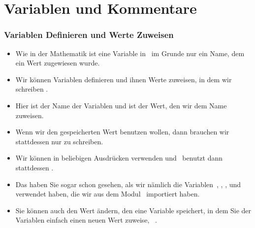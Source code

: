 \documentclass[aspectratio=169,mathserif,notheorems]{beamer}%
\begin{document}
\section{Variablen und Kommentare}%
%
\begin{frame}%
\frametitle{Variablen Definieren und Werte Zuweisen}%
\begin{itemize}%
\item Wie in der Mathematik ist eine Variable in \python\ im Grunde nur ein Name, dem ein Wert zugewiesen wurde.%
\item<2-> Wir können Variablen definieren und ihnen Werte zuweisen, in dem wir schreiben .%
\item<3-> Hier ist  der Name der Variablen und  ist der Wert, den wir dem Name zuweisen.%
\item<4-> Wenn wir den gespeicherten Wert benutzen wollen, dann brauchen wir stattdessen nur  zu schreiben.%
\item<5-> Wir können  in beliebigen Ausdrücken verwenden und \python\ benutzt dann stattdessen .%
\item<6-> Das haben Sie sogar schon gesehen, als wir nämlich die Variablen~, , , und  verwendet haben, die wir aus dem Modul~ importiert haben.%
\item<7-> Sie können auch den Wert ändern, den eine Variable speichert, in dem Sie der Variablen einfach einen neuen Wert zuweise, \DEzB~.%
\end{itemize}%
\end{frame}%
%
\end{document}
